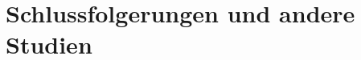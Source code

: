 \section{Schlussfolgerungen und andere Studien}
\begin{frame}
    \frametitle{\currentsectionname}

\end{frame}
